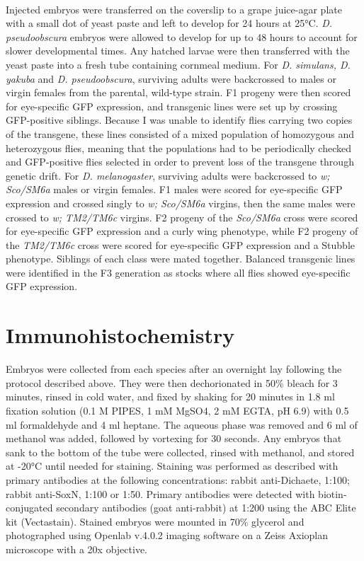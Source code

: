 \paragraph{}
Injected embryos were transferred on the coverslip to a grape juice-agar plate with a small dot of yeast paste and left to develop for 24 hours at 25°C. \emph{D. pseudoobscura} embryos were allowed to develop for up to 48 hours to account for slower developmental times. Any hatched larvae were then transferred with the yeast paste into a fresh tube containing cornmeal medium. For \emph{D. simulans, D. yakuba} and \emph{D. pseudoobscura}, surviving adults were backcrossed to males or virgin females from the parental, wild-type strain. F1 progeny were then scored for eye-specific GFP expression, and transgenic lines were set up by crossing GFP-positive siblings. Because I was unable to identify flies carrying two copies of the transgene, these lines consisted of a mixed population of homozygous and heterozygous flies, meaning that the populations had to be periodically checked and GFP-positive flies selected in order to prevent loss of the transgene through genetic drift. For \emph{D. melanogaster}, surviving adults were backcrossed to \emph{w; Sco/SM6a} males or virgin females. F1 males were scored for eye-specific GFP expression and crossed singly to \emph{w; Sco/SM6a} virgins, then the same males were crossed to \emph{w; TM2/TM6c} virgins. F2 progeny of the \emph{Sco/SM6a} cross were scored for eye-specific GFP expression and a curly wing phenotype, while F2 progeny of the \emph{TM2/TM6c} cross were scored for eye-specific GFP expression and a Stubble phenotype. Siblings of each class were mated together. Balanced transgenic lines were identified in the F3 generation as stocks where all flies showed eye-specific GFP expression. 

\section{Immunohistochemistry}
Embryos were collected from each species after an overnight lay following the protocol described above. They were then dechorionated in 50\% bleach for 3 minutes, rinsed in cold water, and fixed by shaking for 20 minutes in 1.8 ml fixation solution (0.1 M PIPES, 1 mM MgSO4, 2 mM EGTA, pH 6.9) with 0.5 ml formaldehyde and 4 ml heptane. The aqueous phase was removed and 6 ml of methanol was added, followed by vortexing for 30 seconds. Any embryos that sank to the bottom of the tube were collected, rinsed with methanol, and stored at -20°C until needed for staining. Staining was performed as described \citep{patel_imaging_1994} with primary antibodies at the following concentrations: rabbit anti-Dichaete, 1:100; rabbit anti-SoxN, 1:100 or 1:50. Primary antibodies were detected with biotin-conjugated secondary antibodies (goat anti-rabbit) at 1:200 using the ABC Elite kit (Vectastain). Stained embryos were mounted in 70\% glycerol and photographed using Openlab v.4.0.2 imaging software on a Zeiss Axioplan microscope with a 20x objective.

